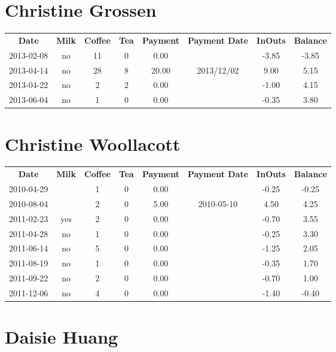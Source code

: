 \section{Christine Grossen}

\begin{center}
\begin{tabular}{cccccccc}
\textbf{Date} & \textbf{Milk} & \textbf{Coffee} & \textbf{Tea} & \textbf{Payment} & \textbf{Payment Date} & \textbf{InOuts} & \textbf{Balance} \\
2013-02-08 & no & 11 & 0 &  0.00 &  & -3.85 & -3.85\\ 
2013-04-14 & no & 28 & 8 & 20.00 & 2013/12/02 &  9.00 &  5.15\\ 
2013-04-22 & no &  2 & 2 &  0.00 &  & -1.00 &  4.15\\ 
2013-06-04 & no &  1 & 0 &  0.00 &  & -0.35 &  3.80
\end{tabular}
\end{center}

\section{Christine Woollacott}

\begin{center}
\begin{tabular}{cccccccc}
\textbf{Date} & \textbf{Milk} & \textbf{Coffee} & \textbf{Tea} & \textbf{Payment} & \textbf{Payment Date} & \textbf{InOuts} & \textbf{Balance} \\
2010-04-29 &  & 1 & 0 & 0.00 &  & -0.25 & -0.25\\ 
2010-08-04 &  & 2 & 0 & 5.00 & 2010-05-10 &  4.50 &  4.25\\ 
2011-02-23 & yes & 2 & 0 & 0.00 &  & -0.70 &  3.55\\ 
2011-04-28 & no & 1 & 0 & 0.00 &  & -0.25 &  3.30\\ 
2011-06-14 & no & 5 & 0 & 0.00 &  & -1.25 &  2.05\\ 
2011-08-19 & no & 1 & 0 & 0.00 &  & -0.35 &  1.70\\ 
2011-09-22 & no & 2 & 0 & 0.00 &  & -0.70 &  1.00\\ 
2011-12-06 & no & 4 & 0 & 0.00 &  & -1.40 & -0.40
\end{tabular}
\end{center}

\section{Daisie Huang}


